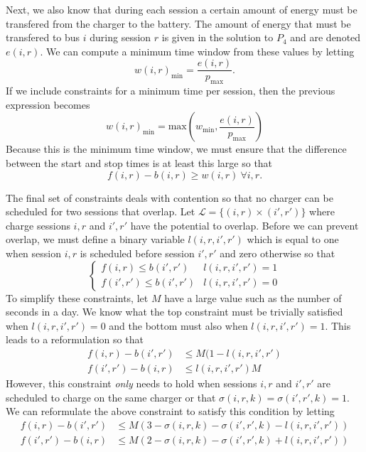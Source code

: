 \par Next, we also know that during each session a certain amount of energy must be transfered from the charger to the battery.  The amount of energy that must be transfered to bus $i$ during session $r$ is given in the solution to $P_4$ and are denoted $e(i,r)$. We can compute a minimum time window from these values by letting 
\begin{equation}\label{eqn:assignment:eqn3}
	w(i,r)_{\text{min}} = \frac{e(i,r)}{p_\text{max}}.
\end{equation}
If we include constraints for a minimum time per session, then the previous expression becomes
\begin{equation*}
	w(i,r)_{\text{min}} = \text{max}\left ( w_{\text{min}}, \frac{e(i,r)}{p_\text{max}} \right )
\end{equation*}
Because this is the minimum time window, we must ensure that the difference between the start and stop times is at least this large so that
\begin{equation}\label{eqn:assignment:eqn4}
	f(i,r) - b(i,r) \ge w(i,r) \ \forall i,r.
\end{equation}
\par The final set of constraints deals with contention so that no charger can be scheduled for two sessions that overlap. Let $\mathcal{L} = \{(i,r)\times (i',r') \}$ where charge sessions $i,r$ and $i',r'$ have the potential to overlap. Before we can prevent overlap, we must define a binary variable $l(i,r,i',r')$ which is equal to one when session $i,r$ is scheduled before session $i',r'$ and zero otherwise so that
\begin{equation}
	\begin{cases}
		f(i,r) \le b(i',r') & l(i,r,i',r') = 1 \\
		f(i',r') \le b(i',r') & l(i,r,i',r') = 0 
	\end{cases}
\end{equation}
To simplify these constraints, let $M$ have a large value such as the number of seconds in a day. We know what the top constraint must be trivially satisfied when $l(i,r,i',r') = 0$ and the bottom must also when $l(i,r,i',r') = 1$.  This leads to a reformulation so that
\begin{equation*}\begin{aligned}
		f(i,r) - b(i',r') & \le M(1 - l(i,r,i',r')\\
		f(i',r') - b(i,r) & \le l(i,r,i',r')M  
\end{aligned}\end{equation*}
However, this constraint {\it only} needs to hold when sessions $i,r$ and $i',r'$ are scheduled to charge on the same charger or that $\sigma(i,r,k) = \sigma(i',r',k) = 1$. We can reformulate the above constraint to satisfy this condition by letting
\begin{equation}\label{eqn:assignment:eqn5}\begin{aligned}
	f(i,r) - b(i',r') & \le M(3 - \sigma(i,r,k) - \sigma(i',r',k) - l(i,r,i',r')) \\
	f(i',r') - b(i,r) & \le M(2 - \sigma(i,r,k) - \sigma(i',r',k) + l(i,r,i',r'))
\end{aligned}\end{equation}

